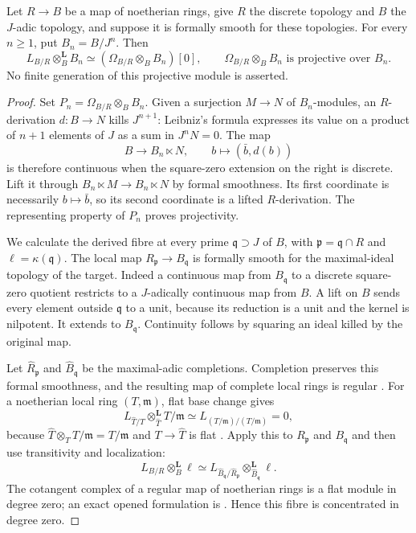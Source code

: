 \begin{lemma}
\label{SA23-A-14}
Let $R\to B$ be a map of noetherian rings, give $R$ the discrete
topology and $B$ the $J$-adic topology, and suppose it is formally
smooth for these topologies. For every $n\geq1$, put $B_n=B/J^n$.
Then
\[
 L_{B/R}\otimes_B^{\mathbf L}B_n
 \simeq(\Omega_{B/R}\otimes_B B_n)[0],
 \qquad \Omega_{B/R}\otimes_B B_n\text{ is projective over }B_n.
\]
No finite generation of this projective module is asserted.
\end{lemma}
\begin{proof}
Set $P_n=\Omega_{B/R}\otimes_B B_n$. Given a surjection $M\to N$
of $B_n$-modules, an $R$-derivation $d:B\to N$ kills $J^{n+1}$:
Leibniz's formula expresses its value on a product of $n+1$ elements
of $J$ as a sum in $J^nN=0$. The map
\[
 B\longrightarrow B_n\ltimes N,\qquad b\longmapsto(\bar b,d(b))
\]
is therefore continuous when the square-zero extension on the right
is discrete. Lift it through $B_n\ltimes M\to B_n\ltimes N$ by formal
smoothness. Its first coordinate is necessarily $b\mapsto\bar b$,
so its second coordinate is a lifted $R$-derivation. The representing
property of $P_n$ proves projectivity.

We calculate the derived fibre at every prime $\mathfrak q\supset J$
of $B$, with $\mathfrak p=\mathfrak q\cap R$ and
$\ell=\kappa(\mathfrak q)$. The local map
$R_{\mathfrak p}\to B_{\mathfrak q}$ is formally smooth for the
maximal-ideal topology of the target. Indeed a continuous map from
$B_{\mathfrak q}$ to a discrete square-zero quotient restricts to a
$J$-adically continuous map from $B$. A lift on $B$ sends every
element outside $\mathfrak q$ to a unit, because its reduction is a
unit and the kernel is nilpotent. It extends to $B_{\mathfrak q}$.
Continuity follows by squaring an ideal killed by the original map.

Let $\widehat R_{\mathfrak p}$ and $\widehat B_{\mathfrak q}$ be the
maximal-adic completions. Completion preserves this formal
smoothness, and the resulting map of complete local rings is regular
\cite[Proposition 15.50.2 and its cited completion lemma]{rootStacksAndre}.
For a noetherian local ring $(T,\mathfrak m)$, flat base change gives
\[
 L_{\widehat T/T}\otimes_{\widehat T}^{\mathbf L}T/\mathfrak m
 \simeq L_{(T/\mathfrak m)/(T/\mathfrak m)}=0,
\]
because $\widehat T\otimes_T T/\mathfrak m=T/\mathfrak m$ and
$T\to\widehat T$ is flat
\cite[Lemmas 10.97.2 and 92.6.2]{rootStacksNoetherianCompletion,rootStacksBaseChange}.
Apply this to $R_{\mathfrak p}$ and
$B_{\mathfrak q}$ and then use transitivity and localization:
\[
 L_{B/R}\otimes_B^{\mathbf L}\ell
 \simeq
 L_{\widehat B_{\mathfrak q}/\widehat R_{\mathfrak p}}
       \otimes_{\widehat B_{\mathfrak q}}^{\mathbf L}\ell .
\]
The cotangent complex of a regular map of noetherian rings is a flat
module in degree zero; an exact opened formulation is
\cite[Theorem 2.10]{rootBlickleFink2025}. Hence this fibre is
concentrated in degree zero.


\end{proof}
